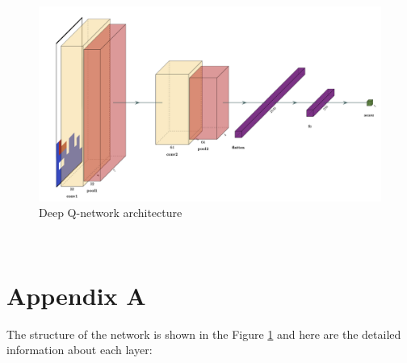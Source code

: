 \documentclass[letterpaper]{article} %
\begin{document}





\newpage






\begin{figure}[b!]
  \centering
  \includegraphics[width=0.75\linewidth]{figures/DQN.png}
  \caption{Deep Q-network architecture}
  \label{fig:DQN}
\end{figure}
\newpage
$\,$
\newpage
\section{Appendix A}

The structure of the network is shown in the Figure \ref{fig:DQN} and here are the detailed information about each layer:
\end{document}

